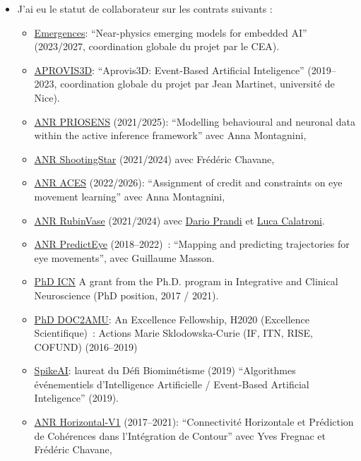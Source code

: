 \documentclass[10pt,french,a4paper,oneside]{article}%
\begin{document}
\begin{itemize}
\item J'ai eu le statut de collaborateur sur les contrats suivants :
\begin{itemize}
	\item  \href{https://laurentperrinet.github.io/grant/emergences/}{Emergences}: ``Near-physics emerging models for embedded AI'' (2023/2027, coordination globale du projet par le CEA).
	\item  \href{https://laurentperrinet.github.io/grant/aprovis-3-d/}{APROVIS3D}: ``Aprovis3D: Event-Based Artificial Inteligence'' (2019--2023, coordination globale du projet par Jean Martinet, université de Nice).
 	\item \href{https://laurentperrinet.github.io/grant/anr-priosens/}{ANR PRIOSENS} (2021/2025): ``Modelling behavioural and neuronal data within the active inference framework'' avec Anna Montagnini,
 	 \item \href{https://laurentperrinet.github.io/grant/anr-shootingstar/}{ANR ShootingStar} (2021/2024) avec Frédéric Chavane,
	  \item \href{https://laurentperrinet.github.io/grant/anr-aces/}{ANR ACES} (2022/2026): ``Assignment of credit and constraints on eye movement learning'' avec Anna Montagnini,
	  \item \href{https://laurentperrinet.github.io/grant/anr-rubinvase/}{ANR RubinVase} (2021/2024) avec \href{https://scholar.google.com/citations?user=22p8Wc4AAAAJ}{Dario Prandi} et \href{https://scholar.google.com/citations?user=dRVPKmkAAAAJ}{Luca Calatroni}.
	  \item \href{https://laurentperrinet.github.io/grant/anr-predicteye/}{ANR PredictEye} (2018--2022)~: ``Mapping and predicting trajectories for eye movements'', avec Guillaume Masson.
	\item \href{https://laurentperrinet.github.io/grant/phd-icn/}{PhD ICN} A grant from the Ph.D. program in Integrative and Clinical Neuroscience (PhD position, 2017 / 2021).
	\item  \href{https://laurentperrinet.github.io/grant/doc-2-amu/}{PhD DOC2AMU}: An Excellence Fellowship, H2020 (Excellence Scientifique)~: Actions Marie Sklodowska-Curie (IF, ITN, RISE, COFUND) (2016--2019)
	\item  \href{https://laurentperrinet.github.io/grant/spikeai/}{SpikeAI}: laureat du Défi Biomimétisme (2019) ``Algorithmes événementiels d’Intelligence Artificielle / Event-Based Artificial Inteligence'' (2019).
	 \item \href{https://laurentperrinet.github.io/grant/anr-horizontal-v1/}{ANR Horizontal-V1} (2017--2021): ``Connectivité Horizontale et Prédiction de Cohérences dans l’Intégration de Contour'' avec Yves Fregnac et Frédéric Chavane,

\end{itemize}
\end{itemize}
\end{document}
